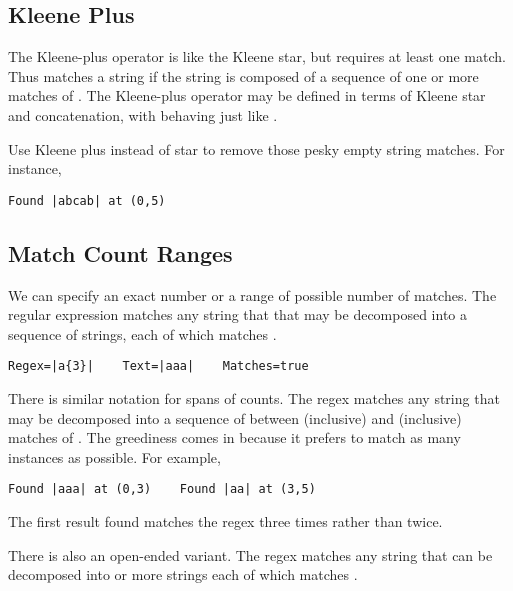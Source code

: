 \subsection{Kleene Plus}

The Kleene-plus operator is like the Kleene star, but requires at
least one match.  Thus \code{+} matches a string if the
string is composed of a sequence of one or more matches of
.  The Kleene-plus operator may be defined in terms
of Kleene star and concatenation, with  behaving
just like .  

Use Kleene plus instead
of star to remove those pesky empty string matches.  For instance, 
%
\begin{verbatim}
Found |abcab| at (0,5)
\end{verbatim}

\subsection{Match Count Ranges}

We can specify an exact number or a range of possible number of
matches.  The regular expression 
matches any string that that may be decomposed into a sequence of
 strings, each of which matches .
%
\begin{verbatim}
Regex=|a{3}|    Text=|aaa|    Matches=true
\end{verbatim}
%

There is similar notation for spans of counts.  The regex
 matches any string that
may be decomposed into a sequence of between  (inclusive)
and  (inclusive) matches of .  The greediness
comes in because it prefers to match as many instances as possible.
For example,
%
\begin{verbatim}
Found |aaa| at (0,3)    Found |aa| at (3,5)
\end{verbatim}
%
The first result found matches the regex  three times
rather than twice.  

There is also an open-ended variant.  The regex
 matches any string that can be
decomposed into  or more strings each of which matches
.

